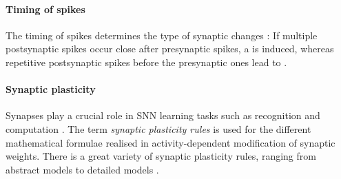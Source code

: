 \paragraph{\textbf{Timing of spikes}}
The timing of spikes determines the type of synaptic changes \cite{LTP_D_bio}:
If multiple postsynaptic spikes occur close after presynaptic spikes, a  is induced, 
whereas repetitive postsynaptic spikes before the presynaptic ones lead to .


\paragraph{\textbf{Synaptic plasticity}}
Synapses play a crucial role in \ac{SNN} learning tasks such as recognition and computation \cite{Synaptic_plasticity}.
The term \textit{synaptic plasticity rules} is used for the different mathematical formulae realised in activity-dependent modification of synaptic weights.
There is a great variety of synaptic plasticity rules, ranging from abstract models to detailed models \cite{Synaptic_plasticity}.

